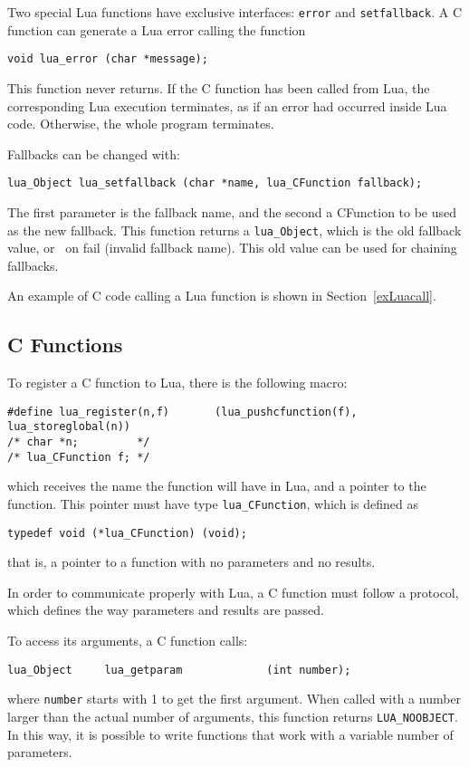 Two special Lua functions have exclusive interfaces:
\verb'error' and \verb'setfallback'.
A C function can generate a Lua error calling the function
\begin{verbatim}
void lua_error (char *message);
\end{verbatim}
This function never returns.
If the C function has been called from Lua,
the corresponding Lua execution terminates,
as if an error had occurred inside Lua code.
Otherwise, the whole program terminates.

Fallbacks can be changed with:
\begin{verbatim}
lua_Object lua_setfallback (char *name, lua_CFunction fallback);
\end{verbatim}
The first parameter is the fallback name,
and the second a CFunction to be used as the new fallback.
This function returns a \verb'lua_Object',
which is the old fallback value,
or \nil\ on fail (invalid fallback name).
This old value can be used for chaining fallbacks.

An example of C code calling a Lua function is shown in
Section~\ref{exLuacall}.


\subsection{C Functions} \label{LuacallC}
To register a C function to Lua,
there is the following macro:
\begin{verbatim}
#define lua_register(n,f)       (lua_pushcfunction(f), lua_storeglobal(n))
/* char *n;         */
/* lua_CFunction f; */
\end{verbatim}
which receives the name the function will have in Lua,
and a pointer to the function.
This pointer must have type \verb'lua_CFunction',
which is defined as
\begin{verbatim}
typedef void (*lua_CFunction) (void);
\end{verbatim}
that is, a pointer to a function with no parameters and no results.

In order to communicate properly with Lua,
a C function must follow a protocol,
which defines the way parameters and results are passed.

To access its arguments, a C function calls:
\begin{verbatim}
lua_Object     lua_getparam             (int number);
\end{verbatim}
where \verb'number' starts with 1 to get the first argument.
When called with a number larger than the actual number of arguments,
this function returns
\verb'LUA_NOOBJECT'.
In this way, it is possible to write functions that work with
a variable number of parameters.


